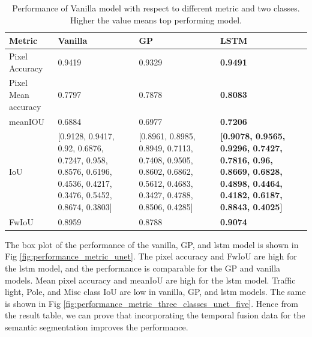	\begin{table}
		\begin{center}
			\begin{tabular}{ | l | p{4cm} | p{4cm} | p{4cm} |}
				\hline
				
				\cellcolor{purple!30}Metric & \cellcolor{purple!30}Vanilla & \cellcolor{purple!30}GP & \cellcolor{purple!30}LSTM\\ \hline
				Pixel Accuracy & 0.9419 & 0.9329 & {\bf 0.9491} \\ \hline
				Pixel Mean accuracy & 0.7797 & 0.7878 & {\bf 0.8083}  \\ \hline
				meanIOU & 0.6884 & 0.6977 & {\bf 0.7206} \\ \hline
				IoU & [0.9128, 0.9417, 0.92, 0.6876, 0.7247, 0.958, 0.8576, 0.6196, 0.4536, 0.4217, 0.3476, 0.5452, 0.8674, 0.3803] & 
				[0.8961, 0.8985, 0.8949, 0.7113, 0.7408, 0.9505, 0.8602, 0.6862, 0.5612, 0.4683, 0.3427, 0.4788, 0.8506, 0.4285]
				& {\bf [0.9078, 0.9565, 0.9296, 0.7427, 0.7816, 0.96, 0.8669, 0.6828, 0.4898, 0.4464, 0.4182, 0.6187, 0.8843, 0.4025]} 
				\\ \hline
				FwIoU & 0.8959 & 0.8788 & {\bf 0.9074} \\ \hline
				\hline
			\end{tabular}
			\caption{Performance of Vanilla model with respect to different metric and two classes. Higher the value means top performing model.}
			\label{table:Vanilla_conti_seq}
		\end{center}
	\end{table}
	
	The box plot of the performance of the vanilla, GP, and lstm model is shown in Fig \ref{fig:performance_metric_unet}. The pixel accuracy and  FwIoU are high for the lstm model, and the performance is comparable for the GP and vanilla models. Mean pixel accuracy and meanIoU are high for the lstm model. Traffic light, Pole, and Misc class IoU are low in vanilla, GP, and lstm models. The same is shown in Fig \ref{fig:performance_metric_three_classes_unet_five}. Hence from the result table, we can prove that incorporating the temporal fusion data for the semantic segmentation improves the performance. 
	
%		

